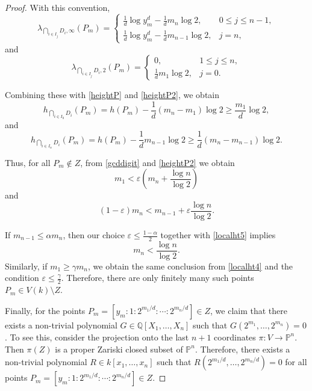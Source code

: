 \documentclass[10pt]{amsart}
\numberwithin{equation}{section}
\theoremstyle{plain}
\theoremstyle{definition}
\begin{document}
\begin{proof}
With this convention,
\begin{equation}\label{localhtinf}
\lambda_{\bigcap_{i\in I_j}D_i,\infty}(P_m)
=
\begin{cases}
\displaystyle \frac{1}{d}\log y_m^d-\frac{1}{d}m_n\log2,
& 0\le j\le n-1,\\[6pt]
\displaystyle \frac{1}{d}\log y_m^d-\frac{1}{d}m_{n-1}\log2,
& j=n ,
\end{cases}
\end{equation}
and
\begin{equation}\label{localht2adic}
\lambda_{\bigcap_{i\in I_j}D_i,2}(P_m)
=
\begin{cases}
0, & 1\le j\le n,\\[4pt]
\displaystyle \frac{1}{d}m_1\log2, & j=0 .
\end{cases}
\end{equation}

Combining these with \eqref{heightP} and \eqref{heightP2}, we obtain
\begin{equation}\label{localht2}
h_{\bigcap_{i\in I_0}D_i}(P_m)
= h(P_m)-\frac{1}{d}(m_n-m_1)\log2
\ge \frac{m_1}{d}\log2 ,
\end{equation}
and
\begin{equation}\label{localht3}
h_{\bigcap_{i\in I_n}D_i}(P_m)
= h(P_m)-\frac{1}{d}m_{n-1}\log2
\ge \frac{1}{d}(m_n-m_{n-1})\log2 .
\end{equation}

Thus, for all $P_m\notin Z$, from \eqref{gcddigit} and \eqref{heightP2} we obtain
\begin{equation}\label{localht4}
m_1<\varepsilon\!\left(m_n+\frac{\log n}{\log2}\right)
\end{equation}
and
\begin{equation}\label{localht5}
(1-\varepsilon)m_n<m_{n-1}+\varepsilon\frac{\log n}{\log2}.
\end{equation}

If $m_{n-1}\le \alpha m_n$, then our choice $\varepsilon\le\frac{1-\alpha}{2}$ together with \eqref{localht5} implies
\[
m_n<\frac{\log n}{\log2}.
\]
Similarly, if $m_1\ge \gamma m_n$, we obtain the same conclusion from \eqref{localht4} and the condition $\varepsilon\le\frac{\gamma}{2}$.
Therefore, there are only finitely many such points $P_m\in V(k)\setminus Z$.
 
Finally, for the points $P_m=[y_m:1:2^{m_1/d}:\cdots:2^{m_n/d}] \in Z$, we claim that there exists a non-trivial polynomial $G \in \mathbb{Q}[X_1, \dots, X_n]$ such that $G(2^{m_1}, \dots, 2^{m_n})=0$. 
To see this, consider the projection onto the last $n+1$ coordinates 
$\pi  : V  \rightarrow \mathbb{P}^{n}$.  Then $\pi(Z)$ is a proper Zariski closed subset of $\mathbb P^n$.  Therefore, 
there exists a non-trivial polynomial $R \in k[x_1, \dots, x_n]$ such that $R(2^{m_1/d}, \dots, 2^{m_n/d}) = 0$ for all points $P_m=[y_m:1:2^{m_1/d}:\cdots:2^{m_n/d}] \in Z$. 


\end{proof}
\end{document}
